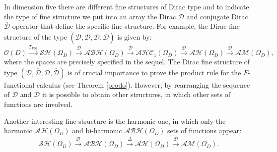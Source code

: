 \documentclass[reqno,11pt]{amsart}
\numberwithin{equation}{section}
\theoremstyle{definition}
\begin{document}
\medskip
In dimension five there are different fine structures of Dirac type
and to indicate the type of fine structure we put
into an array the Dirac $\mathcal{D}$ and conjugate Dirac $\overline{\mathcal{D}}$ operator that define the specific fine structure.
For example, the  Dirac fine structure of the type $(\mathcal{D}, \mathcal{\overline{D}}, \mathcal{D}, \mathcal{\overline{D}} )$ is given by:
\begin{equation}
\mathcal{O}(D) \overset{T_{FS1}}{\longrightarrow} \mathcal{SH}(\Omega_D)\overset{\mathcal{D}}{\longrightarrow} \mathcal{ABH}(\Omega_D)\overset{\mathcal{\overline{D}}}{\longrightarrow}\mathcal{AHC}_1(\Omega_D) \overset{\mathcal{D}}{\longrightarrow} \mathcal{AH}(\Omega_D) \overset{\mathcal{\overline{D}}}{\longrightarrow} \mathcal{AM}(\Omega_D),
\end{equation}
where the spaces are precisely specified in the sequel.
The Dirac fine structure of type $(\mathcal{D}, \mathcal{\overline{D}}, \mathcal{D}, \mathcal{\overline{D}} )$ is of
crucial importance to prove the product rule for the $F$-functional calculus (see Theorem \ref{prodo}).
However, by rearranging the sequence of $ \mathcal{D}$ and $ \mathcal{\overline{D}}$ it is possible to obtain other structures,
in which other sets of functions are involved.

\medskip
Another interesting  fine structure is the harmonic one, in which only the harmonic $\mathcal{AH}(\Omega_D)$ and bi-harmonic $\mathcal{ABH}(\Omega_D)$ sets of functions  appear:
$$ \mathcal{SH}(\Omega_D)\overset{\mathcal{D}}{\longrightarrow}  \mathcal{ABH}(\Omega_D) \overset{\Delta}{\longrightarrow}  \mathcal{AH}(\Omega_D)\overset{\overline{\mathcal{D}}}{\longrightarrow} \mathcal{AM}(\Omega_D).$$
\end{document}
